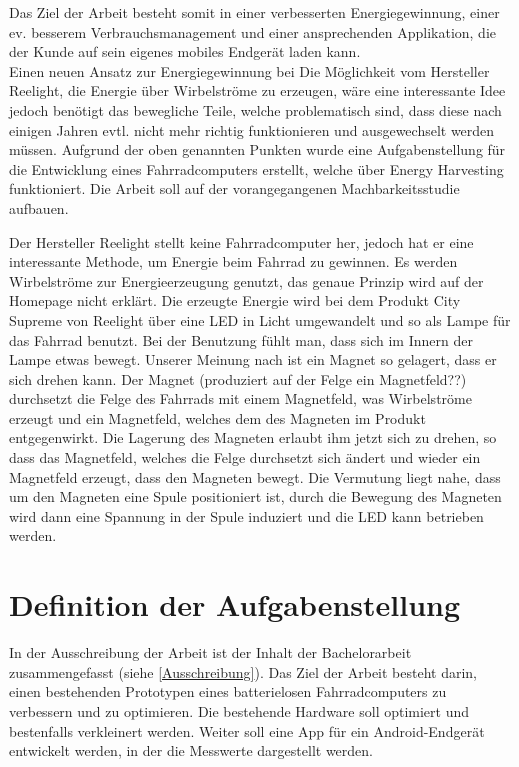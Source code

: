 Das Ziel der Arbeit besteht somit in einer verbesserten Energiegewinnung, einer ev. besserem Verbrauchsmanagement und einer ansprechenden Applikation, die der Kunde auf sein eigenes mobiles Endgerät laden kann.\\

Einen neuen Ansatz zur Energiegewinnung bei 
Die Möglichkeit vom Hersteller Reelight, die Energie über Wirbelströme zu erzeugen, wäre eine interessante Idee jedoch benötigt das bewegliche Teile, welche problematisch sind, dass diese nach einigen Jahren evtl. nicht mehr richtig funktionieren und ausgewechselt werden müssen. Aufgrund der oben genannten Punkten wurde eine Aufgabenstellung für die Entwicklung eines Fahrradcomputers erstellt, welche über Energy Harvesting funktioniert. Die Arbeit soll auf der vorangegangenen Machbarkeitsstudie aufbauen.

Der Hersteller Reelight stellt keine Fahrradcomputer her, jedoch hat er eine interessante Methode, um Energie beim Fahrrad zu gewinnen. Es werden Wirbelströme zur Energieerzeugung genutzt, das genaue Prinzip wird auf der Homepage nicht erklärt. Die erzeugte Energie wird bei dem Produkt City Supreme von Reelight über eine LED in Licht umgewandelt und so als Lampe für das Fahrrad benutzt. Bei der Benutzung fühlt man, dass sich im Innern der Lampe etwas bewegt. Unserer Meinung nach ist ein Magnet so gelagert, dass er sich drehen kann. Der Magnet (produziert auf der Felge ein Magnetfeld??) durchsetzt die Felge des Fahrrads mit einem Magnetfeld, was Wirbelströme erzeugt und ein Magnetfeld, welches dem des Magneten im Produkt entgegenwirkt. Die Lagerung des Magneten erlaubt ihm jetzt sich zu drehen, so dass das Magnetfeld, welches die Felge durchsetzt sich ändert und wieder ein Magnetfeld erzeugt, dass den Magneten bewegt. Die Vermutung liegt nahe, dass um den Magneten eine Spule positioniert ist, durch die Bewegung des Magneten wird dann eine Spannung in der Spule induziert und die LED kann betrieben werden.\\



\section{Definition der Aufgabenstellung}\label{Aufgabenstellung} 
In der Ausschreibung der Arbeit ist der Inhalt der Bachelorarbeit zusammengefasst (siehe \ref{Ausschreibung}). Das Ziel der Arbeit besteht darin, einen bestehenden Prototypen eines batterielosen Fahrradcomputers zu verbessern und zu optimieren. Die bestehende Hardware soll optimiert und bestenfalls verkleinert werden. Weiter soll eine App für ein Android-Endgerät entwickelt werden, in der die Messwerte dargestellt werden.

